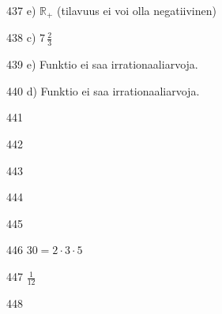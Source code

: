\begin{Vastaus}{437}
	e) $\mathbb{R}_+$ (tilavuus ei voi olla negatiivinen)
	
\end{Vastaus}
\begin{Vastaus}{438}
	c) $7\,\frac{2}{3}$
	
\end{Vastaus}
\begin{Vastaus}{439}
	e) Funktio ei saa irrationaaliarvoja.
	
\end{Vastaus}
\begin{Vastaus}{440}
	d) Funktio ei saa irrationaaliarvoja.
	
\end{Vastaus}
\begin{Vastaus}{441}
	
\end{Vastaus}
\begin{Vastaus}{442}
	
\end{Vastaus}
\begin{Vastaus}{443}
	
\end{Vastaus}
\begin{Vastaus}{444}
	
\end{Vastaus}
\begin{Vastaus}{445}
	
\end{Vastaus}
\begin{Vastaus}{446}
	$30=2\cdot3\cdot5$
	
\end{Vastaus}
\begin{Vastaus}{447}
		$\frac{1}{12}$
	
\end{Vastaus}
\begin{Vastaus}{448}
\end{Vastaus}
